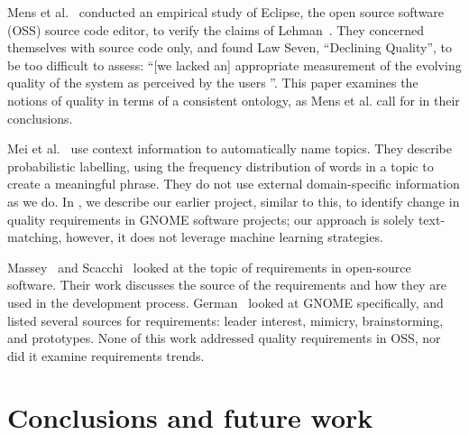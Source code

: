 \documentclass[]{sig-alternate}
\begin{document}
Mens et al.~\cite{mens08icsm} conducted an empirical study of Eclipse, the open source software (OSS) source code editor, to verify the claims of Lehman~\cite{lehman97sms}.
 They concerned themselves with source code only, and found Law Seven, ``Declining Quality'', to be too difficult to assess: ``[we lacked an] appropriate measurement of the evolving quality of the system as perceived by the users \cite[p. 388]{mens08icsm}''. 
This paper examines the notions of quality in terms of a consistent ontology, as Mens et al. call for in their conclusions.

Mei et al.~\cite{Mei2007} use context information to automatically name topics. 
They describe probabilistic labelling, using the frequency distribution of words in a topic to create a meaningful phrase. 
They do not use external domain-specific information as we do.
In \cite{ernst10refsq}, we describe our earlier project, similar to this, to identify change in quality requirements in GNOME software projects; our approach is solely text-matching, however, it does not leverage machine learning strategies.

Massey~\cite{massey02icse} and Scacchi~\cite{scacchi05b} looked at the topic of requirements in open-source software. 
Their work discusses the source of the requirements and how they are used in the development process. German~\cite{german03gnome} looked at GNOME specifically, and listed several sources for requirements: leader interest, mimicry, brainstorming, and prototypes. None of this work  addressed quality requirements in OSS, nor did it examine requirements trends.



\section{Conclusions and future work}
\end{document}
